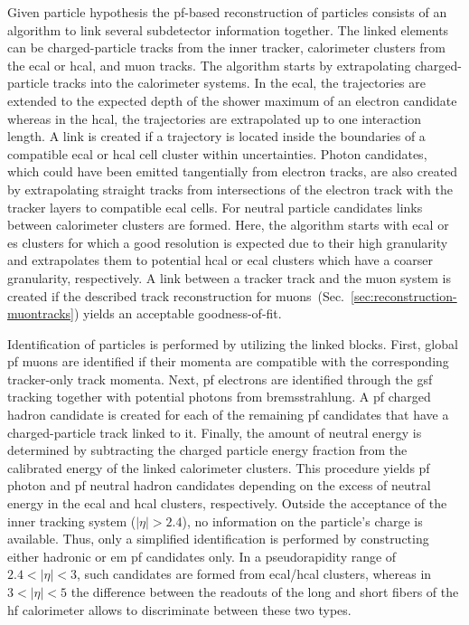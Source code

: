 Given particle hypothesis the \gls{pf}-based reconstruction of particles consists of an algorithm to link several subdetector information together. The linked elements can be charged-particle tracks from the inner tracker, calorimeter clusters from the \gls{ecal} or \gls{hcal}, and muon tracks. The algorithm starts by extrapolating charged-particle tracks into the calorimeter systems. In the \gls{ecal}, the trajectories are extended to the expected depth of the shower maximum of an electron candidate whereas in the \gls{hcal}, the trajectories are extrapolated up to one interaction length. A link is created if a trajectory is located inside the boundaries of a compatible \gls{ecal} or \gls{hcal} cell cluster within uncertainties. Photon candidates, which could have been emitted tangentially from electron tracks, are also created by extrapolating straight tracks from intersections of the electron track with the tracker layers to compatible \gls{ecal} cells. For neutral particle candidates links between calorimeter clusters are formed. Here, the algorithm starts with \gls{ecal} or \gls{es} clusters for which a good resolution is expected due to their high granularity and extrapolates them to potential \gls{hcal} or \gls{ecal} clusters which have a coarser granularity, respectively. A link between a tracker track and the muon system is created if the described track reconstruction for muons~(Sec.~\ref{sec:reconstruction-muontracks}) yields an acceptable goodness-of-fit.

Identification of particles is performed by utilizing the linked blocks. First, global \gls{pf} muons are identified if their momenta are compatible with the corresponding tracker-only track momenta. Next, \gls{pf} electrons are identified through the \gls{gsf} tracking together with potential photons from bremsstrahlung. A \gls{pf} charged hadron candidate is created for each of the remaining \gls{pf} candidates that have a charged-particle track linked to it. Finally, the amount of neutral energy is determined by subtracting the charged particle energy fraction from the calibrated energy of the linked calorimeter clusters. This procedure yields \gls{pf} photon and \gls{pf} neutral hadron candidates depending on the excess of neutral energy in the \gls{ecal} and \gls{hcal} clusters, respectively. Outside the acceptance of the inner tracking system ($|\eta|>2.4$), no information on the particle's charge is available. Thus, only a simplified identification is performed by constructing either hadronic or \gls{em} \gls{pf} candidates only. In a pseudorapidity range of $2.4<|\eta|<3$, such candidates are formed from \gls{ecal}/\gls{hcal} clusters, whereas in $3<|\eta|<5$ the difference between the readouts of the long and short fibers of the \gls{hf} calorimeter allows to discriminate between these two types.


